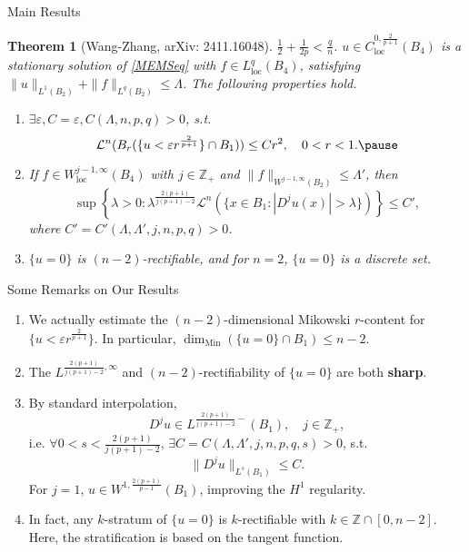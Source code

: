 \documentclass[11pt]{beamer}
\newcommand{\lda}{\lambda}
\newcommand{\va}{\varepsilon}
\newcommand{\Lda}{\Lambda}
\newcommand{\cL}{\mathcal{L}}
\newcommand{\Z}{\mathbb{Z}}
\newcommand{\ift}{\infty}
\newcommand{\f}{\frac}
\newcommand{\op}{\operatorname}
\DeclareMathOperator{\loc}{loc}
\theoremstyle{plain}
\newtheorem{thm}{Theorem}
\theoremstyle{definition}
\begin{document}
\begin{frame}{Main Results}

\begin{thm}[Wang-Zhang, arXiv: 2411.16048]
$ \f{1}{2}+\f{1}{2p}<\f{q}{n} $. $ u\in C_{\loc}^{0,\f{2}{p+1}}(B_4) $ is a stationary solution of \eqref{MEMSeq} with $ f\in L_{\loc}^q(B_4) $, satisfying $ \|u\|_{L^1(B_2)}+\|f\|_{L^q(B_2)}\leq\Lda $.
The following properties hold.\pause
\begin{enumerate}
\item $ \exists\va,C=\va,C(\Lda,n,p,q)>0 $, s.t.
$$
\cL^n(B_r(\{u<\va r^{\f{2}{p+1}}\}\cap B_1))\leq Cr^2,\quad 0<r<1.\pause
$$
\item If $ f\in W_{\loc}^{j-1,\ift}(B_4) $ with $ j\in\Z_+ $ and $ \|f\|_{W^{j-1,\ift}(B_2)}\leq\Lda' $, then
$$
\sup\left\{\lda>0:\lda^{\f{2(p+1)}{j(p+1)-2}}\cL^n(\{x\in B_1:|D^ju(x)|>\lda\})\right\}\leq C',
$$
where $ C'=C'(\Lda,\Lda',j,n,p,q)>0 $.\pause
\item $ \{u=0\} $ is $ (n-2) $-rectifiable, and for $ n=2 $, $ \{u=0\} $ is a discrete set. 
\end{enumerate}
\end{thm}

\end{frame}

\begin{frame}{Some Remarks on Our Results}

\begin{enumerate}
\item We actually estimate the $ (n-2) $-dimensional Mikowski $ r $-content for $ \{u<\va r^{\f{2}{p+1}}\} $. In particular, $ \dim_{\op{Min}}(\{u=0\}\cap B_1)\leq n-2 $.\pause
\item The $ L^{\f{2(p+1)}{j(p+1)-2},\ift} $ and $ (n-2) $-rectifiability of $ \{u=0\} $ are both \textbf{sharp}. 
\item By standard interpolation, 
$$
D^ju\in L^{\f{2(p+1)}{j(p+1)-2}-}(B_1),\quad j\in\Z_+,
$$
i.e. $ \forall 0<s<\f{2(p+1)}{j(p+1)-2} $, $ \exists C=C(\Lda,\Lda',j,n,p,q,s)>0 $, s.t. 
$$
\|D^ju\|_{L^s(B_1)}\leq C. 
$$ 
For $ j=1 $, $ u\in W^{1,\f{2(p+1)}{p-1}}(B_1) $, improving the $ H^1 $ regularity.\pause
\item In fact, any $ k $-stratum of $ \{u=0\} $ is $ k $-rectifiable with $ k\in\Z\cap[0,n-2] $. Here, the stratification is based on the tangent function.
\end{enumerate}

\end{frame}
\end{document}
